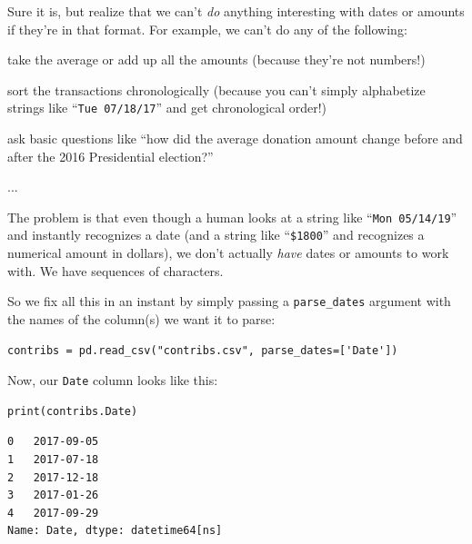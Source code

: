 Sure it is, but realize that we can't \textit{do} anything interesting with
dates or amounts if they're in that format. For example, we can't do any of the
following:

\begin{compactitem}
\item[\leftthumbsdown] take the average or add up all the amounts (because they're not numbers!)
\item[\leftthumbsdown] sort the transactions chronologically (because you can't
simply alphabetize strings like ``\texttt{Tue 07/18/17}'' and get chronological
order!)
\item[\leftthumbsdown] ask basic questions like ``how did the average donation
amount change before and after the 2016 Presidential election?''
\item[\leftthumbsdown] ...
\end{compactitem}

The problem is that even though a human looks at a string like ``\texttt{Mon
05/14/19}'' and instantly recognizes a date (and a string like
``\texttt{\$1800}'' and recognizes a numerical amount in dollars), we don't
actually \textit{have} dates or amounts to work with. We have sequences of
characters.


So we fix all this in an instant by simply passing a \texttt{parse\_dates}
argument with the names of the column(s) we want it to parse:

\begin{Verbatim}[fontsize=\footnotesize,samepage=true,frame=single,framesep=3mm]
contribs = pd.read_csv("contribs.csv", parse_dates=['Date'])
\end{Verbatim}

Now, our \texttt{Date} column looks like this:

\begin{Verbatim}[fontsize=\small,samepage=true,frame=single,framesep=3mm]
print(contribs.Date)
\end{Verbatim}
\vspace{-.2in}

\begin{Verbatim}[fontsize=\small,samepage=true,frame=leftline,framesep=5mm,framerule=1mm]
0   2017-09-05
1   2017-07-18
2   2017-12-18
3   2017-01-26
4   2017-09-29
Name: Date, dtype: datetime64[ns]
\end{Verbatim}

